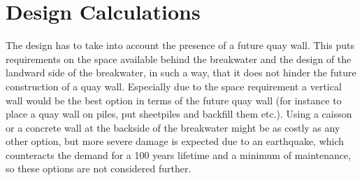 \chapter{Design Calculations}

The design has to take into account the presence of a future quay wall.
This puts requirements on the space available behind the breakwater and the design of the landward side of the breakwater, in such a way, that it does not hinder the future construction of a quay wall.
Especially due to the space requirement a vertical wall would be the best option in terms of the future quay wall (for instance to place a quay wall on piles, put sheetpiles and backfill them etc.).
Using a caisson or a concrete wall at the backside of the breakwater might be as costly as any other option, but more severe damage is expected due to an earthquake, which counteracts the demand for a 100 years lifetime and a minimum of maintenance, so these options are not considered further.
